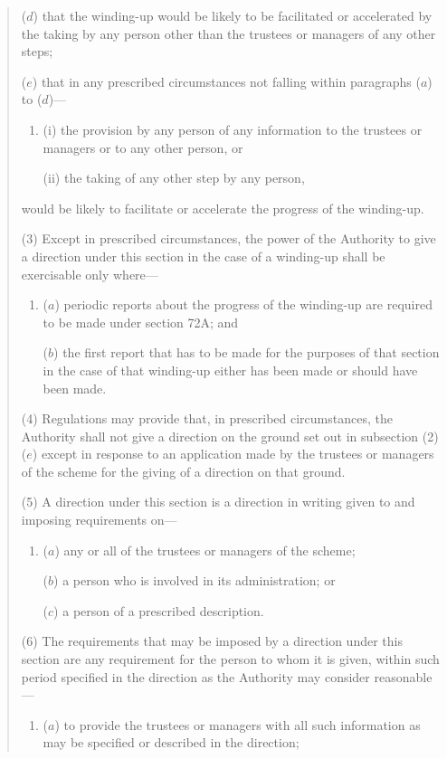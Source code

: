 \documentclass[12pt,a4paper]{article}
\begin{document}
\begin{quotation}
\begin{enumerate}
($d$) that the winding-up would be likely to be facilitated or accelerated by the taking by any person other than the trustees or managers of any other steps;

($e$) that in any prescribed circumstances not falling within paragraphs ($a$)  to ($d$)—
\begin{enumerate}\item[]
(i) the provision by any person of any information to the trustees or managers or to any other person, or

(ii) the taking of any other step by any person,
\end{enumerate}
would be likely to facilitate or accelerate the progress of the winding-up.
\end{enumerate}

(3) Except in prescribed circumstances, the power of the Authority to give a direction under this section in the case of a winding-up shall be exercisable only where—
\begin{enumerate}\item[]
($a$) periodic reports about the progress of the winding-up are required to be made under section 72A; and

($b$) the first report that has to be made for the purposes of that section in the case of that winding-up either has been made or should have been made.
\end{enumerate}

(4) Regulations may provide that, in prescribed circumstances, the Authority shall not give a direction on the ground set out in subsection (2)($e$)  except in response to an application made by the trustees or managers of the scheme for the giving of a direction on that ground.

(5) A direction under this section is a direction in writing given to and imposing requirements on—
\begin{enumerate}\item[]
($a$) any or all of the trustees or managers of the scheme;

($b$) a person who is involved in its administration; or

($c$) a person of a prescribed description.
\end{enumerate}

(6) The requirements that may be imposed by a direction under this section are any requirement for the person to whom it is given, within such period specified in the direction as the Authority may consider reasonable—
\begin{enumerate}\item[]
($a$) to provide the trustees or managers with all such information as may be specified or described in the direction;


\end{enumerate}
\end{quotation}
\end{document}
